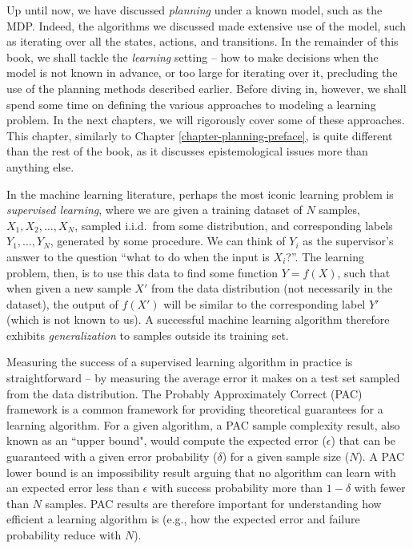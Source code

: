 Up until now, we have discussed \textit{planning} under a known model, such as the MDP. Indeed, the algorithms we discussed made extensive use of the model, such as iterating over all the states, actions, and transitions.
In the remainder of this book, we shall tackle the \textit{learning} setting -- how to make decisions when the model is not known in advance, or too large for iterating over it, precluding the use of the planning methods described earlier. Before diving in, however, we shall spend some time on defining the various approaches to modeling a learning problem. In the next chapters, we will rigorously cover some of these approaches. This chapter, similarly to Chapter \ref{chapter-planning-preface}, is quite different than the rest of the book, as it discusses epistemological issues more than anything else. 

In the machine learning literature, perhaps the most iconic learning problem is \textit{supervised learning}, where we are given a training dataset of $N$ samples, $X_1,X_2,\dots, X_N$, sampled i.i.d.~from some distribution, and corresponding labels $Y_1,\dots,Y_N$, generated by some procedure. We can think of $Y_i$ as the supervisor's answer to the question ``what to do when the input is $X_i$?''. The learning problem, then, is to use this data to find some function $Y = f(X)$, such that when given a new sample $X'$ from the data distribution (not necessarily in the dataset), the output of $f(X')$ will be similar to the corresponding label $Y'$ (which is not known to us). A successful machine learning algorithm therefore exhibits \textit{generalization} to samples outside its training set.

Measuring the success of a supervised learning algorithm in practice is straightforward -- by measuring the average error it makes on a test set sampled from the data distribution. The Probably Approximately Correct (PAC) framework is a common framework for providing theoretical guarantees for a learning algorithm. For a given algorithm, a PAC sample complexity result, also known as an ``upper bound", would compute the expected error ($\epsilon$) that can be guaranteed with a given error probability ($\delta$) for a given sample size ($N$). A PAC lower bound is an impossibility result arguing that no algorithm can learn with an expected error less than $\epsilon$ with success probability more than $1-\delta$ with fewer than $N$ samples.
PAC results are therefore important for understanding how efficient a learning algorithm is (e.g., how the expected error and failure probability reduce with $N$).

